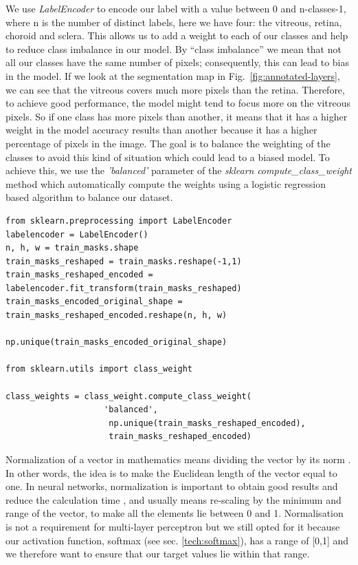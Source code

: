 \documentclass[12pt,a4paper]{scrartcl}
\begin{document}
We use \emph{LabelEncoder} \cite{scikit-learn} to encode our label with a value between 0 and n-classes-1, where n is the number of distinct labels, here we have four: the vitreous, retina, choroid and sclera. This allows us to add a weight to each of our classes and help to reduce class imbalance in our model. By ``class imbalance'' we mean that not all our classes have the same number of pixels; consequently, this can lead to bias in the model. If we look at the segmentation map in Fig.~\ref{fig:annotated-layers}, we can see that the vitreous covers much more pixels than the retina. Therefore, to achieve good performance, the model might tend to focus more on the vitreous pixels. So if one class has more pixels than another, it means that it has a higher weight in the model accuracy results than another because it has a higher percentage of pixels in the image. The goal is to balance the weighting of the classes to avoid this kind of situation which could lead to a biased model. To achieve this, we use the \emph{'balanced'} parameter of the \emph{sklearn} \cite{scikit-learn} \emph{compute\_class\_weight} method which automatically compute the weights using a logistic regression based algorithm \cite{scikit-learn} to balance our dataset. 

\begin{lstlisting}[caption={Encoding of the labels and weights attributions to the class, code from \emph{train.py} file}]
from sklearn.preprocessing import LabelEncoder
labelencoder = LabelEncoder()
n, h, w = train_masks.shape
train_masks_reshaped = train_masks.reshape(-1,1)
train_masks_reshaped_encoded = labelencoder.fit_transform(train_masks_reshaped)
train_masks_encoded_original_shape = train_masks_reshaped_encoded.reshape(n, h, w)

np.unique(train_masks_encoded_original_shape)

from sklearn.utils import class_weight

class_weights = class_weight.compute_class_weight(
                    'balanced',
                     np.unique(train_masks_reshaped_encoded),
                     train_masks_reshaped_encoded)
\end{lstlisting}

Normalization of a vector in mathematics means dividing the vector by its norm \cite{Normalization_Vector_Machines:2001}. In other words, the idea is to make the Euclidean length of the vector equal to one. In neural networks, normalization is important to obtain good results and reduce the calculation time \cite{Normalizazion_NN}, and usually means re-scaling by the minimum and range of the vector, to make all the elements lie between 0 and 1. Normalisation is not a requirement for multi-layer perceptron but we still opted for it because our activation function, softmax (see sec. \ref{tech:softmax}), has a range of [0,1] and we therefore want to ensure that our target values lie within that range.
\end{document}
